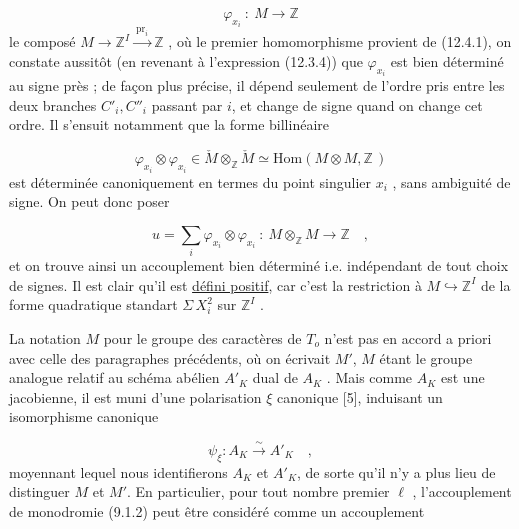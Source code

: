 \begin{equation}\tag{12.4.3}
\varphi_{x_i} \ : \ M \longrightarrow \mathbb{Z}
\end{equation}
le composé $M \longrightarrow \mathbb{Z}^{I} \xrightarrow{\ \mathrm{pr}_i\ } \mathbb{Z}$ , où le premier homomorphisme provient de (12.4.1), on constate aussitôt (en revenant à l'expression (12.3.4)) que $\varphi_{x_i}$ est bien déterminé au signe près ; de façon plus précise, il dépend seulement de l'ordre pris entre les deux branches $C'_i,C''_i$ passant par $i$, et change de signe quand on change cet ordre. Il s'ensuit notamment que la forme billinéaire

\begin{equation}\tag{12.4.4}
\varphi_{x_i} \otimes \varphi_{x_i} \in \check{M} \otimes_{\mathbb{Z}} \check{M} \simeq \mathrm{Hom}(M \otimes M, \mathbb{Z}\,)
\end{equation}
est déterminée canoniquement en termes du point singulier $x_i$ , sans ambiguité de signe. On peut donc poser

\begin{equation}\tag{12.4.5}
u = \sum_{i} \varphi_{x_i} \otimes \varphi_{x_i} \ : \ M \otimes_{\mathbb{Z}} M \longrightarrow \mathbb{Z} \quad ,
\end{equation}
et on trouve ainsi un accouplement bien déterminé i.e. indépendant de tout choix de signes. Il est clair qu'il est \underline{défini positif}, car c'est la restriction à $M \hookrightarrow \mathbb{Z}^{I}$ de la forme quadratique standart $\Sigma\, X_i^2$ sur $\mathbb{Z}^{I}$ .



La notation $M$ pour le groupe des caractères de $T_o$ n'est pas en accord a priori avec celle des paragraphes précédents, où on écrivait $M'$, $M$ étant le groupe analogue relatif au schéma abélien $A'_K$ dual de $A_K$ . Mais comme $A_K$ est une jacobienne, il est muni d'une polarisation $\xi$ canonique [5\hspace{2.5em}], induisant un isomorphisme canonique

\begin{equation}\tag{12.4.6}
\psi_{\xi} : A_K \overset{\sim}{\longrightarrow} A'_K \quad ,
\end{equation}
moyennant lequel nous identifierons $A_K$ et $A'_K$, de sorte qu'il n'y a plus lieu de distinguer $M$ et $M'$. En particulier, pour tout nombre premier $\ell$ , l'accouplement de monodromie (9.1.2) peut être considéré comme un accouplement

